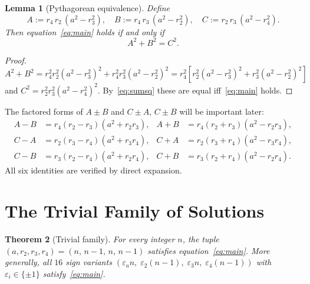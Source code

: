 \documentclass[12pt, a4paper]{article}
\newtheorem{theorem}{Theorem}[section]
\newtheorem{lemma}[theorem]{Lemma}
\theoremstyle{definition}
\begin{document}
\begin{lemma}[Pythagorean equivalence]\label{lem:pyth}
  Define
  \begin{equation}\label{eq:ABC}
    A := r_4\,r_2\,(a^2-r_3^2),\quad
    B := r_4\,r_3\,(a^2-r_2^2),\quad
    C := r_2\,r_3\,(a^2-r_4^2).
  \end{equation}
  Then equation~\eqref{eq:main} holds if and only if
  \begin{equation}\label{eq:pyth}
    A^2 + B^2 = C^2.
  \end{equation}
\end{lemma}

\begin{proof}
  $A^2+B^2 = r_4^2r_2^2(a^2-r_3^2)^2 + r_4^2r_3^2(a^2-r_2^2)^2
    = r_4^2[r_2^2(a^2-r_3^2)^2 + r_3^2(a^2-r_2^2)^2]$
  and $C^2 = r_2^2r_3^2(a^2-r_4^2)^2$.
  By~\eqref{eq:sumsq} these are equal iff~\eqref{eq:main} holds.
\end{proof}

The factored forms of $A\pm B$ and $C\pm A$, $C\pm B$ will be important later:
\begin{align}
  A - B &= r_4(r_2-r_3)(a^2+r_2r_3), & A+B &= r_4(r_2+r_3)(a^2-r_2r_3),\label{eq:AB}\\
  C - A &= r_2(r_3-r_4)(a^2+r_3r_4), & C+A &= r_2(r_3+r_4)(a^2-r_3r_4),\label{eq:CA}\\
  C - B &= r_3(r_2-r_4)(a^2+r_2r_4), & C+B &= r_3(r_2+r_4)(a^2-r_2r_4).\label{eq:CB}
\end{align}
All six identities are verified by direct expansion.

\section{The Trivial Family of Solutions}\label{sec:trivial}

\begin{theorem}[Trivial family]\label{thm:trivial}
  For every integer $n$, the tuple $(a, r_2, r_3, r_4) = (n,\,n-1,\,n,\,n-1)$
  satisfies equation~\eqref{eq:main}.  More generally, all $16$ sign variants
  $(\varepsilon_a n,\;\varepsilon_2(n-1),\;\varepsilon_3 n,\;\varepsilon_4(n-1))$
  with $\varepsilon_i \in \{\pm 1\}$ satisfy~\eqref{eq:main}.
\end{theorem}
\end{document}
